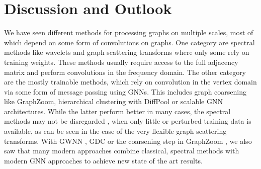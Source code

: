 \documentclass{article}
\begin{document}
%
%
%
\section{Discussion and Outlook}

We have seen different methods for processing graphs on multiple scales, most of which depend on some form of convolutions on graphs. One category are spectral methods like wavelets and graph scattering transforms where only some rely on training weights. These methods usually require access to the full adjacency matrix and perform convolutions in the frequency domain. The other category are the mostly trainable methods, which rely on convolution in the vertex domain via some form of message passing using GNNs. This includes graph coarsening like GraphZoom, hierarchical clustering with DiffPool or scalable GNN architectures. While the latter perform better in many cases, the spectral methods may not be disregarded \cite{xu2018powerful},  when only little or perturbed training data is available, as can be seen in the case of the very flexible graph scattering transforms. With GWNN \cite{xu2019graph}, GDC \cite{klicpera2019diffusion} or the coarsening step in GraphZoom \cite{deng2020graphzoom}, we also saw that many modern approaches combine classical, spectral methods with modern GNN approaches to achieve new state of the art results.
\end{document}
